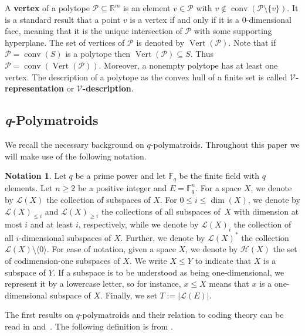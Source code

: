 \documentclass[a4paper,11pt,reqno]{amsart}
\theoremstyle{definition}
\newtheorem{notation}[theorem]{{{Notation}}}
\newcommand{\mL}{\mathcal{L}}
\newcommand{\mH}{\mathcal{H}}
\newcommand{\mP}{\mathcal{P}}
\newcommand{\F}{\mathbb F}
\newcommand{\R}{\mathbb R}
\DeclareMathOperator{\conv}{conv}
\DeclareMathOperator{\ver}{Vert}
\begin{document}
{A \textbf{vertex} of a polytope $\mP \subseteq \R^m$ is an element $v \in \mP$ with $v \notin \conv(\mP \setminus \{v\})$. It is a standard result that a point $v$ is a vertex if and only if it is a $0$-dimensional face, meaning that it is the unique intersection of $\mathcal{P}$ with some supporting hyperplane.
The set of vertices of $\mP$ is denoted by $\ver(\mP)$. Note that if $\mP=\conv(S)$ is a polytope then $\ver(\mP) \subseteq S$.
Thus $\mP=\conv(\ver(\mP))$. Moreover, a nonempty polytope has at least one vertex. 
The description of a polytope as the convex hull of a finite set  is called \textbf{$\mathcal{V}$-representation} or \textbf{$\mathcal{V}$-description}. 



\subsection{\emph{q}-Polymatroids} We recall the necessary background on $q$-polymatroids.
Throughout this paper we will make use of the following notation.

\begin{notation}\label{not:standing_notation}
Let $q$ be a prime power and let $\F_q$ be the finite field with $q$ elements. Let $n\geq 2$ be a positive integer and $E=\F_q^n$. For a space $X$, we denote by $\mL(X)$ the collection of subspaces of $X$. For $0\leq i\leq \dim(X)$, we denote by $\mL(X)_{\leq i}$ and $\mL(X)_{\geq i}$ the collections of all subspaces of~$X$ with dimension at most $i$ and at least $i$, respectively, while we denote by $\mL(X)_{i}$ the collection of all $i$-dimensional subspaces of $X$. Further, we denote by $\mL(X)^\ast$ the collection $\mL(X)\setminus\langle 0 \rangle$. For ease of notation, given a space $X$, we denote by $\mH(X)$ the set of codimension-one subspaces of $X$.
We write $X\leq Y$ to indicate that $X$ is a subspace of $Y$. If a subspace is to be understood as being one-dimensional, we represent it by a lowercase letter, so for instance, $x \leq X$ means that $x$ is a one-dimensional subspace of $X$. 
Finally, we set $T:=|\mL(E)|$. 
\end{notation}


The first results on $q$-polymatroids and their relation to coding theory can be read in \cite{gorla2019rank} and~\cite{shiromoto2019codes}. The following definition is from \cite[Def. 4.1]{gorla2019rank}.

}
\end{document}
